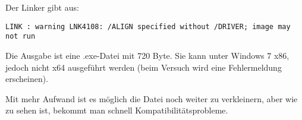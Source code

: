 Der Linker gibt aus:

\begin{lstlisting}
LINK : warning LNK4108: /ALIGN specified without /DRIVER; image may not run
\end{lstlisting}

Die Ausgabe ist eine .exe-Datei mit 720 Byte.
Sie kann unter Windows 7 x86, jedoch nicht x64 ausgeführt werden (beim Versuch wird
eine Fehlermeldung erscheinen).

Mit mehr Aufwand ist es möglich die Datei noch weiter zu verkleinern, aber wie zu
sehen ist, bekommt man schnell Kompatibilitätsprobleme.

